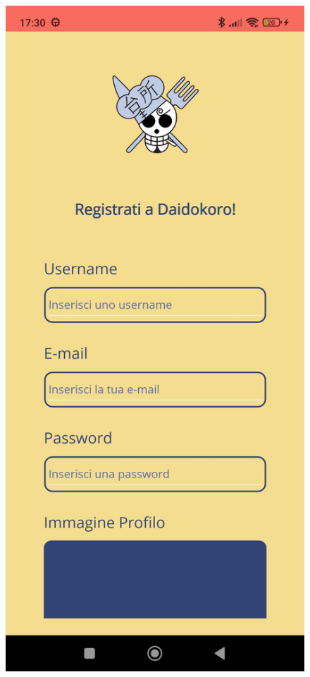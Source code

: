 ﻿\documentclass[a4paper,12pt]{report}
\begin{document}
\begin{figure}[h!]
\begin{minipage}{.5\textwidth}
    \end{minipage}
    \begin{minipage}{.5\textwidth}
        \centering
        \includegraphics[width=0.9\linewidth]{app_images/Register.jpg}
    \end{minipage}
\end{figure}
\end{document}
